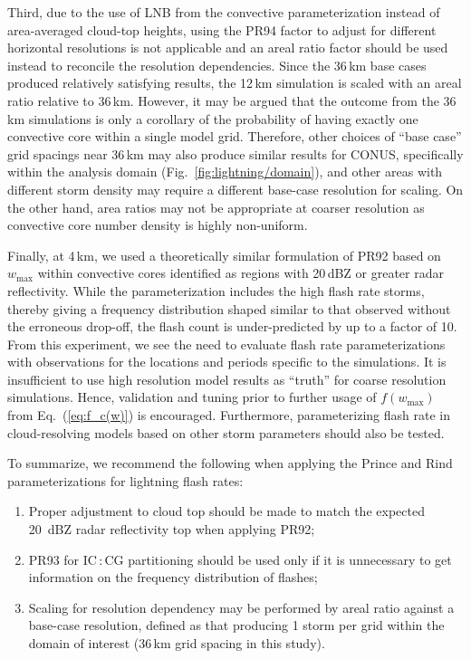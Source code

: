Third, due to the use of LNB from the convective parameterization instead of
area-averaged cloud-top heights, using the PR94 factor to adjust for different
horizontal resolutions is not applicable and an areal ratio factor should be
used instead to reconcile the resolution dependencies. Since the 36\,\unit{km} base
cases produced relatively satisfying results, the 12\,\unit{km} simulation is
scaled with an areal ratio relative to 36\,\unit{km}. However, it may be
argued that the outcome from the 36\,\unit{km} simulations is only a
corollary of the probability of having exactly one convective core within a
single model grid. Therefore, other choices of ``base case'' grid spacings
near 36\,\unit{km} may also produce similar results for CONUS, specifically
within the analysis domain (Fig.~\ref{fig:lightning/domain}), and other areas with
different storm density may require a different base-case resolution for
scaling. On the other hand, area ratios may not be appropriate at coarser
resolution as convective core number density is highly non-uniform.

Finally, at 4\,\unit{km}, we used a theoretically similar formulation of PR92
based on $w_{\max}$ within convective cores identified as regions with
20\,\unit{dBZ} or greater radar reflectivity. While the parameterization
includes the high flash rate storms, thereby giving a frequency distribution
shaped similar to that observed without the erroneous drop-off, the flash
count is under-predicted by up to a factor of 10. From this experiment, we
see the need to evaluate flash rate parameterizations with observations for
the locations and periods specific to the simulations. It is insufficient to
use high resolution model results as ``truth'' for coarse resolution
simulations. Hence, validation and tuning prior to further usage of
$f(w_{\max})$ from Eq.~(\ref{eq:f_c(w)}) is encouraged. Furthermore,
parameterizing flash rate in cloud-resolving models based on other storm
parameters \citep{Barthe:2010uq} should also be tested.

To summarize, we recommend the following when applying the Prince and Rind
parameterizations for lightning flash rates:
\begin{enumerate}
\item Proper adjustment to cloud top should be made to match the expected 20~\unit{dBZ} radar reflectivity top when applying PR92;
 \item PR93 for IC\,:\,CG partitioning should be used only if it is unnecessary to get information on the frequency distribution of flashes;
  \item Scaling for resolution dependency may be performed by areal ratio against a base-case resolution, defined as that producing 1 storm per grid within the domain of interest (36\,\unit{km} grid spacing in this study).
  \end{enumerate}

